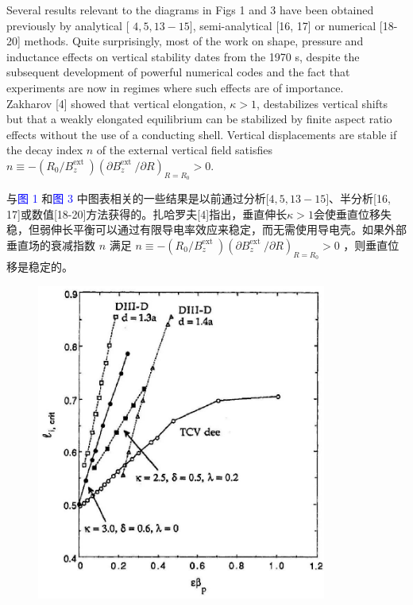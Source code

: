 \documentclass[utf8]{ctexart}
\newcommand\enzhbox[2]{
  	\quad\par \begin{paracol}{2} \colseprulecolor{black} 
  		\begin{spacing}{1.0}
  			\footnotesize  #1
  		\end{spacing}
  		\switchcolumn[1] 
  		#2
  	\end{paracol} \quad\par
  }
\begin{document}
\begin{sloppypar}
\enzhbox{  Several results relevant to the diagrams in Figs 1 and 3 have been obtained previously by analytical [ $4,5,13-15]$, semi-analytical \textcolor{green!50!black}{[16, 17]} or numerical \textcolor{green!50!black}{[18-20]} methods. Quite surprisingly, most of the work on shape, pressure and inductance effects on vertical stability dates from the 1970 s, despite the subsequent development of powerful numerical codes and the fact that experiments are now in regimes where such effects are of importance.\\ Zakharov \textcolor{green!50!black}{[4]} showed that vertical elongation, $\kappa>1$, destabilizes vertical shifts but that a weakly elongated equilibrium can be stabilized by finite aspect ratio effects without the use of a conducting shell. Vertical displacements are stable if the decay index $n$ of the external vertical field satisfies $n \equiv-\left(R_{0} / B_{z}^{\text {ext }}\right)\left(\partial B_{z}^{\text {ext }} / \partial R\right)_{R=R_{0}}>0$.}{
与\textcolor{blue}{图 1} 和\textcolor{blue}{图 3} 中图表相关的一些结果是以前通过分析[$4,5,13-15]$、半分析\textcolor{green!50!black}{[16, 17]}或数值\textcolor{green!50!black}{[18-20]}方法获得的。扎哈罗夫\textcolor{green!50!black}{[4]}指出，垂直伸长$\kappa>1$会使垂直位移失稳，但弱伸长平衡可以通过有限导电率效应来稳定，而无需使用导电壳。如果外部垂直场的衰减指数 $n$  满足 $n \equiv-\left(R_{0} / B_{z}^{\text {ext }}\right)\left(\partial B_{z}^{\text {ext }} / \partial R\right)_{R=R_{0}}>0$ ，则垂直位移是稳定的。}
  \begin{figure}[H]
  	\centering
  	\includegraphics[max width=0.85\textwidth,max height=0.3\textheight]{2025_01_10_a0135324997886412d98g-5}

\end{figure}
\end{sloppypar}
\end{document}
